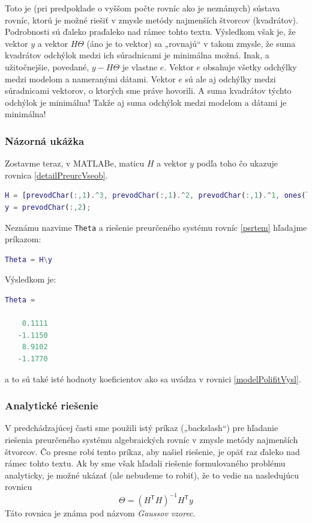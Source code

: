 \documentclass[a4paper, 10pt, ]{article}
\begin{document}
Toto je (pri predpoklade o vyššom počte rovníc ako je neznámych) sústava rovníc, ktorú je možné riešiť v zmysle metódy najmenších štvorcov (kvadrátov). Podrobnosti sú ďaleko praďaleko nad rámec tohto textu. Výsledkom však je, že vektor $y$ a vektor $H \Theta$ (áno je to vektor) sa „rovnajú“ v takom zmysle, že suma kvadrátov odchýlok medzi ich súradnicami je minimálna možná. Inak, a užitočnejšie, povedané, $y - H \Theta$ je vlastne $e$. Vektor $e$ obsahuje všetky odchýlky medzi modelom a nameranými dátami. Vektor $e$ sú ale aj odchýlky medzi súradnicami vektorov, o ktorých sme práve hovorili. A suma kvadrátov týchto odchýlok je minimálna! Takže aj suma odchýlok medzi modelom a dátami je minimálna!






\subsubsection{Názorná ukážka}

Zostavme teraz, v MATLABe, maticu $H$ a vektor $y$ podľa toho čo ukazuje rovnica \eqref{detailPreurcVseob}.
\begin{lstlisting}[language=Matlab,]
H = [prevodChar(:,1).^3, prevodChar(:,1).^2, prevodChar(:,1).^1, ones(length(prevodChar(:,1)), 1)];
y = prevodChar(:,2);
\end{lstlisting}
Neznámu nazvime \verb|Theta| a riešenie preurčeného systému rovníc \eqref{psrtem} hľadajme príkazom:
\begin{lstlisting}[language=Matlab,]
Theta = H\y
\end{lstlisting}
Výsledkom je:
\begin{lstlisting}[language=Matlab,]
Theta =

    0.1111
   -1.1150
    8.9102
   -1.1770
\end{lstlisting}
a to sú také isté hodnoty koeficientov ako sa uvádza v rovnici \eqref{modelPolifitVysl}.







\subsubsection{Analytické riešenie}

V predchádzajúcej časti sme použili istý príkaz („backslash“) pre hľadanie riešenia preurčeného systému algebraických rovníc v zmysle metódy najmenších štvorcov. Čo presne robí tento príkaz, aby našiel riešenie, je opäť raz ďaleko nad rámec tohto textu. Ak by sme však hľadali riešenie formulovaného problému analyticky, je možné ukázať (ale nebudeme to robiť), že to vedie na nasledujúcu rovnicu
\begin{equation}
    \Theta = \left( H^\mathsf T H \right)^{-1} H^\mathsf T y
\end{equation}
Táto rovnica je známa pod názvom \emph{Gaussov vzorec}.
\end{document}
